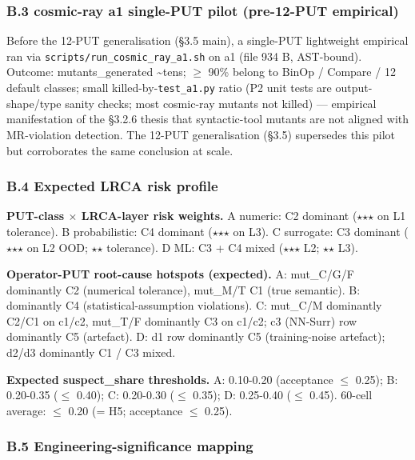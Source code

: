 \documentclass[review,12pt,authoryear]{elsarticle}
\begin{document}
\subsubsection{B.3 cosmic-ray a1 single-PUT pilot (pre-12-PUT
empirical)}\label{b.3-cosmic-ray-a1-single-put-pilot-pre-12-put-empirical}

Before the 12-PUT generalisation (§3.5 main), a single-PUT lightweight
empirical ran via \texttt{scripts/run\_cosmic\_ray\_a1.sh} on a1 (file
934 B, AST-bound). Outcome: mutants\_generated \textasciitilde tens; $\geq$
90\% belong to BinOp / Compare / 12 default classes; small
killed-by-\texttt{test\_a1.py} ratio (P2 unit tests are
output-shape/type sanity checks; most cosmic-ray mutants not killed) ---
empirical manifestation of the §3.2.6 thesis that syntactic-tool mutants
are not aligned with MR-violation detection. The 12-PUT generalisation
(§3.5) supersedes this pilot but corroborates the same conclusion at
scale.

\subsubsection{B.4 Expected LRCA risk
profile}\label{b.4-expected-lrca-risk-profile}

\textbf{PUT-class $\times$ LRCA-layer risk weights.} A numeric: C2 dominant
($\star$$\star$$\star$ on L1 tolerance). B probabilistic: C4 dominant ($\star$$\star$$\star$ on L3). C
surrogate: C3 dominant ($\star$$\star$$\star$ on L2 OOD; $\star$$\star$ tolerance). D ML: C3 + C4
mixed ($\star$$\star$$\star$ L2; $\star$$\star$ L3).

\textbf{Operator-PUT root-cause hotspots (expected).} A: mut\_C/G/F
dominantly C2 (numerical tolerance), mut\_M/T C1 (true semantic). B:
dominantly C4 (statistical-assumption violations). C: mut\_C/M
dominantly C2/C1 on c1/c2, mut\_T/F dominantly C3 on c1/c2; c3 (NN-Surr)
row dominantly C5 (artefact). D: d1 row dominantly C5 (training-noise
artefact); d2/d3 dominantly C1 / C3 mixed.

\textbf{Expected suspect\_share thresholds.} A: 0.10-0.20 (acceptance $\leq$
0.25); B: 0.20-0.35 ($\leq$ 0.40); C: 0.20-0.30 ($\leq$ 0.35); D: 0.25-0.40 ($\leq$
0.45). 60-cell average: $\leq$ 0.20 (= H5; acceptance $\leq$ 0.25).

\subsubsection{B.5 Engineering-significance
mapping}\label{b.5-engineering-significance-mapping}
\end{document}
